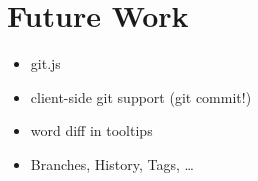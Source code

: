 \section{Future Work}
\label{sec:Future_Work}

\begin{itemize}
	\item git.js
	\item client-side git support (git commit!)
	\item word diff in tooltips
	\item Branches, History, Tags, \dots
\end{itemize}